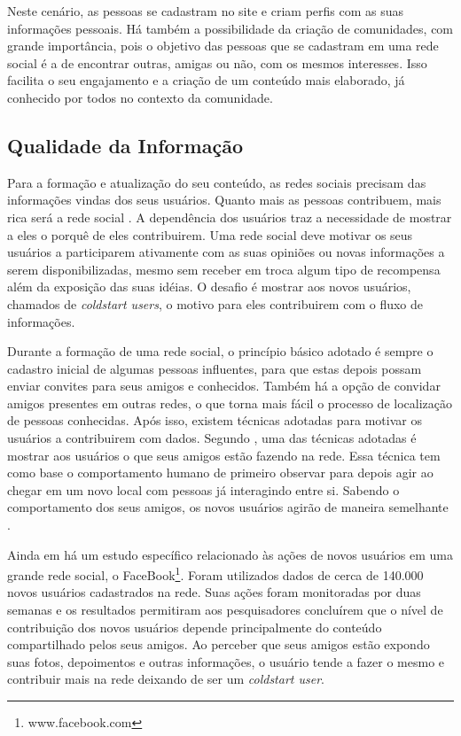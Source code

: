 Neste cenário, as pessoas se cadastram no site e criam perfis com as suas informações pessoais. Há também a possibilidade da criação de comunidades, com grande importância, pois o objetivo das pessoas que se cadastram em uma rede social é a de encontrar outras, amigas ou não, com os mesmos interesses. Isso facilita o seu engajamento e a criação de um conteúdo mais elaborado, já conhecido por todos no contexto da comunidade.

\subsection{Qualidade da Informação}

Para a formação e atualização do seu conteúdo, as redes sociais precisam das informações vindas dos seus usuários. Quanto mais as pessoas contribuem, mais rica será a rede social \cite{burke2009fmm}. A dependência dos usuários traz a necessidade de mostrar a eles o porquê de eles contribuirem. Uma rede social deve motivar os seus usuários a participarem ativamente com as suas opiniões ou novas informações a serem disponibilizadas, mesmo sem receber em troca algum tipo de recompensa além da exposição das suas idéias. O desafio é mostrar aos novos usuários, chamados de \textit{coldstart users}, o motivo para eles contribuirem com o fluxo de informações.

Durante a formação de uma rede social, o princípio básico adotado é sempre o cadastro inicial de algumas pessoas influentes, para que estas depois possam enviar convites para seus amigos e conhecidos. Também há a opção de convidar amigos presentes em outras redes, o que torna mais fácil o processo de localização de pessoas conhecidas. Após isso, existem técnicas adotadas para motivar os usuários a contribuirem com dados. Segundo \cite{burke2009fmm}, uma das técnicas adotadas é mostrar aos usuários o que seus amigos estão fazendo na rede. Essa técnica tem como base o comportamento humano de primeiro observar para depois agir ao chegar em um novo local com pessoas já interagindo entre si. Sabendo o comportamento dos seus amigos, os novos usuários agirão de maneira semelhante \cite{burke2009fmm}.

Ainda em \cite{burke2009fmm} há um estudo específico relacionado às ações de novos usuários em uma grande rede social, o FaceBook\footnote{www.facebook.com}. Foram utilizados dados de cerca de 140.000 novos usuários cadastrados na rede. Suas ações foram monitoradas por duas semanas e os resultados permitiram aos pesquisadores concluírem que o nível de contribuição dos novos usuários depende principalmente do conteúdo compartilhado pelos seus amigos. Ao perceber que seus amigos estão expondo suas fotos, depoimentos e outras informações, o usuário tende a fazer o mesmo e contribuir mais na rede deixando de ser um \textit{coldstart user}.

